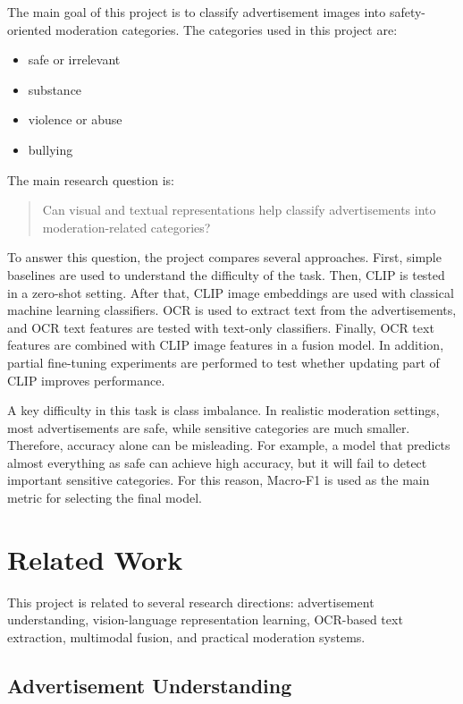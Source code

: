 \documentclass[12pt]{article}
\begin{document}
The main goal of this project is to classify advertisement images into safety-oriented moderation categories. The categories used in this project are:
\begin{itemize}
    \item safe or irrelevant
    \item substance
    \item violence or abuse
    \item bullying
\end{itemize}

The main research question is:
\begin{quote}
Can visual and textual representations help classify advertisements into moderation-related categories?
\end{quote}

To answer this question, the project compares several approaches. First, simple baselines are used to understand the difficulty of the task. Then, CLIP is tested in a zero-shot setting. After that, CLIP image embeddings are used with classical machine learning classifiers. OCR is used to extract text from the advertisements, and OCR text features are tested with text-only classifiers. Finally, OCR text features are combined with CLIP image features in a fusion model. In addition, partial fine-tuning experiments are performed to test whether updating part of CLIP improves performance.

A key difficulty in this task is class imbalance. In realistic moderation settings, most advertisements are safe, while sensitive categories are much smaller. Therefore, accuracy alone can be misleading. For example, a model that predicts almost everything as safe can achieve high accuracy, but it will fail to detect important sensitive categories. For this reason, Macro-F1 is used as the main metric for selecting the final model.

\section{Related Work}

This project is related to several research directions: advertisement understanding, vision-language representation learning, OCR-based text extraction, multimodal fusion, and practical moderation systems.

\subsection{Advertisement Understanding}
\end{document}

